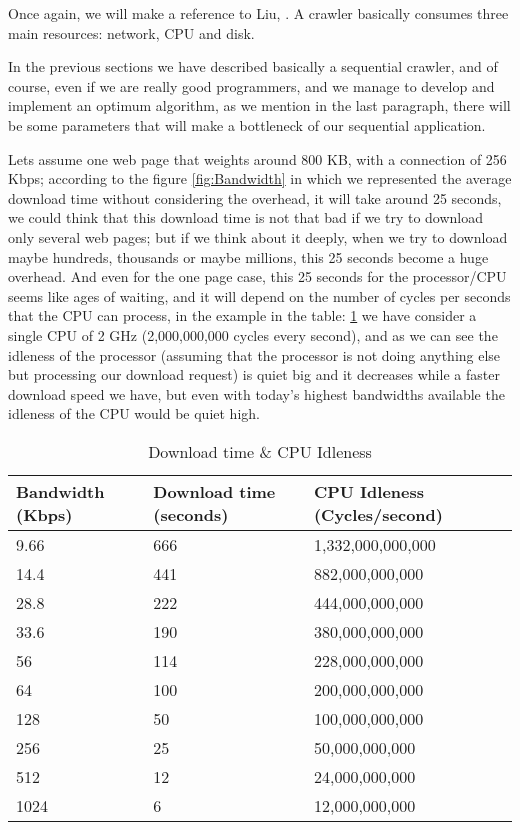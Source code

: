 Once again, we will make a reference to Liu, \cite[p. 322]{L2011}. A crawler basically consumes three main resources: network, CPU and disk. 

In the previous sections we have described basically a sequential crawler, and of course, even if we are really good programmers, and we manage to develop and implement an optimum algorithm, as we mention in the last paragraph, there will be some parameters that will make a bottleneck of our sequential application. 


Lets assume one web page that weights around 800 KB, with a connection of 256 Kbps; according to the figure \ref{fig:Bandwidth} in which we represented the average download time without considering the overhead, it will take around 25 seconds, we could think that this download time is not that bad if we try to download only several web pages; but if we think about it deeply, when we try to download maybe hundreds, thousands or maybe millions, this 25 seconds become a huge overhead. And even for the one page case, this 25 seconds for the processor/CPU seems like ages of waiting, and it will depend on the number of cycles per seconds that the CPU can process, in the example in the table: \ref{tab:downloadIdleness} we have consider a single CPU of 2 GHz (2,000,000,000 cycles every second), and as we can see the idleness of the processor (assuming that the processor is not doing anything else but processing our download request) is quiet big and it decreases while a faster download speed we have, but even with today's highest bandwidths available the idleness of the CPU would be quiet high.

\begin{table}\centering
	\caption{Download time \& CPU Idleness}\label{tab:downloadIdleness}
   	\begin{tabular}{ | p{2.5cm\textwidth} | p{3cm\textwidth} | p{3.5cm\textwidth} |}
   	\hline
   	\textbf{Bandwidth (Kbps)}  & \textbf{Download time (seconds)} & \textbf{CPU Idleness (Cycles/second)}  \\ \hline

	9.66&666&1,332,000,000,000\\ \hline
	14.4&441&882,000,000,000\\ \hline
	28.8&222&444,000,000,000\\ \hline
	33.6&190&380,000,000,000\\ \hline
	56&114&228,000,000,000\\ \hline
	64&100&200,000,000,000\\ \hline
	128&50&100,000,000,000\\ \hline
	256&25&50,000,000,000\\ \hline
	512&12&24,000,000,000\\ \hline
	1024&6&12,000,000,000\\ \hline

    \end{tabular}
\end{table}

